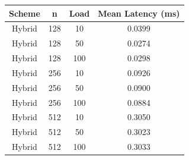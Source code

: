 \begin{tabular}{cccc}
\hline
Scheme & n & Load & Mean Latency (ms) \\
\hline
Hybrid & 128 & 10 & 0.0399 \\
Hybrid & 128 & 50 & 0.0274 \\
Hybrid & 128 & 100 & 0.0298 \\
Hybrid & 256 & 10 & 0.0926 \\
Hybrid & 256 & 50 & 0.0900 \\
Hybrid & 256 & 100 & 0.0884 \\
Hybrid & 512 & 10 & 0.3050 \\
Hybrid & 512 & 50 & 0.3023 \\
Hybrid & 512 & 100 & 0.3033 \\
\hline
\end{tabular}

